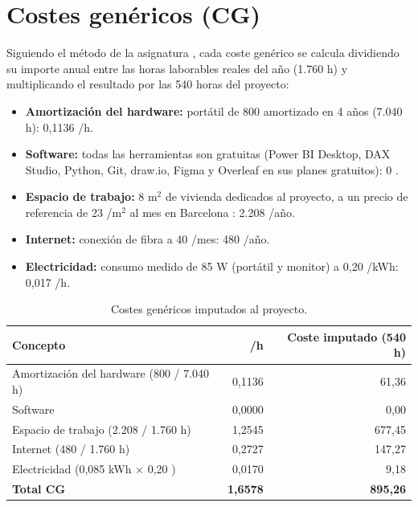 \documentclass[12pt, a4paper, oneside]{report}
\begin{document}
\section{Costes genéricos (CG)}
Siguiendo el método de la asignatura \cite{fib_costos}, cada coste genérico se calcula dividiendo su importe anual entre las horas laborables reales del año (1.760 h) y multiplicando el resultado por las 540 horas del proyecto:
\begin{itemize}
    \item \textbf{Amortización del hardware:} portátil de 800 \texteuro{} amortizado en 4 años (7.040 h): 0,1136 \texteuro{}/h.
    \item \textbf{Software:} todas las herramientas son gratuitas (Power BI Desktop, DAX Studio, Python, Git, draw.io, Figma y Overleaf en sus planes gratuitos): 0 \texteuro{}.
    \item \textbf{Espacio de trabajo:} 8 m$^2$ de vivienda dedicados al proyecto, a un precio de referencia de 23 \texteuro{}/m$^2$ al mes en Barcelona \cite{idealista_barcelona}: 2.208 \texteuro{}/año.
    \item \textbf{Internet:} conexión de fibra a 40 \texteuro{}/mes: 480 \texteuro{}/año.
    \item \textbf{Electricidad:} consumo medido de 85 W (portátil y monitor) a 0,20 \texteuro{}/kWh: 0,017 \texteuro{}/h.
\end{itemize}

\begin{table}[H]
\centering
\small
\renewcommand{\arraystretch}{1.05}
\begin{tabularx}{\textwidth}{@{} X r r @{}}
\toprule
\textbf{Concepto} & \textbf{\texteuro{}/h} & \textbf{Coste imputado (540 h)} \\ \midrule
Amortización del hardware (800 \texteuro{} / 7.040 h) & 0,1136 & 61,36 \texteuro{} \\
Software & 0,0000 & 0,00 \texteuro{} \\
Espacio de trabajo (2.208 \texteuro{} / 1.760 h) & 1,2545 & 677,45 \texteuro{} \\
Internet (480 \texteuro{} / 1.760 h) & 0,2727 & 147,27 \texteuro{} \\
Electricidad (0,085 kWh $\times$ 0,20 \texteuro{}) & 0,0170 & 9,18 \texteuro{} \\ \midrule
\textbf{Total CG} & \textbf{1,6578} & \textbf{895,26 \texteuro{}} \\ \bottomrule
\end{tabularx}
\caption{Costes genéricos imputados al proyecto.}
\label{tab:cg}
\end{table}
\end{document}
